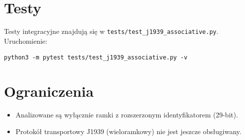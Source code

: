 \documentclass[a4paper,12pt]{article}
\begin{document}
\section{Testy}
Testy integracyjne znajdują się w \texttt{tests/test\_j1939\_associative.py}. Uruchomienie:
\begin{verbatim}
python3 -m pytest tests/test_j1939_associative.py -v
\end{verbatim}

\section{Ograniczenia}
\begin{itemize}[noitemsep]
    \item Analizowane są wyłącznie ramki z rozszerzonym identyfikatorem (29-bit).
    \item Protokół transportowy J1939 (wieloramkowy) nie jest jeszcze obsługiwany.
\end{itemize}
\end{document}
